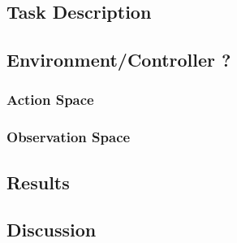 \subsection{Task Description}



\subsection{Environment/Controller ?}



\subsubsection{Action Space}



\subsubsection{Observation Space}




\subsection{Results}



\subsection{Discussion}